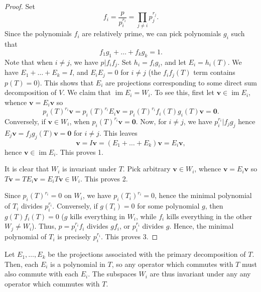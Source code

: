 \documentclass[11pt]{article}
\renewcommand{\vec}[1]{\boldsymbol{#1}}
\newcommand{\vv}{\vec{v}}
\newcommand{\im}{\operatorname{im}}
\theoremstyle{definition}
\theoremstyle{remark}
\numberwithin{equation}{section}
\begin{document}
    \begin{proof}
        Set \[
            f_i = \frac{p}{p_i^{r_i}} = \prod_{j \neq i} p_j^{r_j}.
        \] Since the polynomials $f_i$ are relatively prime, we can pick polynomials
        $g_i$ such that \[
            f_1g_1 + \dots + f_kg_k = 1.
        \] Note that when $i \neq j$, we have $p | f_if_j$. Set $h_i = f_ig_i$, and
        let $E_i = h_i(T)$. We have $E_1 + \dots + E_k = I$, and $E_iE_j = 0$ for $i
        \neq j$ (the $f_if_j(T)$ term contains $p(T) = 0$). This shows that $E_i$ are
        projections corresponding to some direct sum decomposition of $V$. We claim
        that $\im{E_i} = W_i$. To see this, first let $\vv \in \im{E_i}$, whence $\vv
        = E_i\vv$ so \[
            p_i(T)^{r_i}\vv = p_i(T)^{r_i}E_i\vv = p_i(T)^{r_i}f_i(T)g_i(T)\vv =
            \vec{0}.
        \] Conversely, if $\vv \in W_i$, when $p_i(T)^{r_i}\vv = \vec{0}$. Now, for
        $i \neq j$, we have $p_i^{r_i} | f_jg_j$ hence $E_j\vv = f_jg_j(T)\vv =
        \vec{0}$ for $i \neq j$. This leaves \[
            \vv = I\vv = (E_1 + \dots + E_k)\vv = E_i\vv,
        \] hence $\vv \in \im{E_i}$. This proves 1.

        It is clear that $W_i$ is invariant under $T$. Pick arbitrary $\vv \in W_i$,
        whence $\vv = E_i\vv$ so $T\vv = TE_i\vv = E_iT\vv \in W_i$. This proves
        2.

        Since $p_i(T)^{r_i} = 0$ on $W_i$, we have $p_i(T_i)^{r_i} = 0$, hence the
        minimal polynomial of $T_i$ divides $p_i^{r_i}$. Conversely, if $g(T_i) = 0$
        for some polynomial $g$, then $g(T)f_i(T) = 0$ ($g$ kills everything in
        $W_i$, while $f_i$ kills everything in the other $W_j \neq W_i$). Thus, $p =
        p_i^{r_i}f_i$ divides $gf_i$, or $p_i^{r_i}$ divides $g$. Hence, the minimal
        polynomial of $T_i$ is precisely $p_i^{r_i}$. This proves 3.
    \end{proof}

    \begin{corollary}
        Let $E_1, \dots, E_k$ be the projections associated with the primary
        decomposition of $T$. Then, each $E_i$ is a polynomial in $T$, so any
        operator which commutes with $T$ must also commute with each $E_i$. The
        subspaces $W_i$ are thus invariant under any any operator which commutes with
        $T$.
    \end{corollary}
\end{document}
